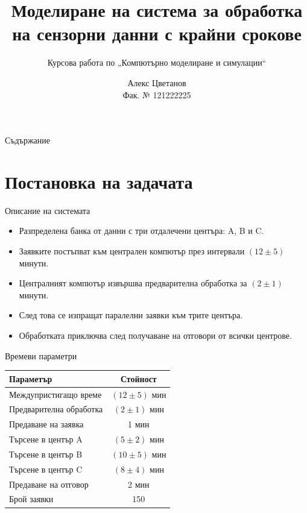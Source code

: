 \documentclass[aspectratio=169]{beamer}
\title{Моделиране на система за обработка на сензорни данни с крайни срокове}
\subtitle{Курсова работа по „Компютърно моделиране и симулации“}
\author{Алекс Цветанов\\Фак. № 121222225}
\institute{Технически университет -- София\\Факултет „Компютърни системи и технологии“}
\date{}
\begin{document}
\begin{frame}
    \titlepage
\end{frame}

\begin{frame}{Съдържание}
    \tableofcontents
\end{frame}

\section{Постановка на задачата}

\begin{frame}{Описание на системата}
    \begin{itemize}
        \item Разпределена банка от данни с три отдалечени центъра: A, B и C.
        \item Заявките постъпват към централен компютър през интервали \((12 \pm 5)\) минути.
        \item Централният компютър извършва предварителна обработка за \((2 \pm 1)\) минути.
        \item След това се изпращат паралелни заявки към трите центъра.
        \item Обработката приключва след получаване на отговори от всички центрове.
    \end{itemize}
\end{frame}

\begin{frame}{Времеви параметри}
    \begin{table}[ht]
        \centering
        \begin{tabular}{lc}
            \toprule
            Параметър & Стойност \\
            \midrule
            Междупристигащо време & \((12 \pm 5)\) мин \\
            Предварителна обработка & \((2 \pm 1)\) мин \\
            Предаване на заявка & 1 мин \\
            Търсене в център A & \((5 \pm 2)\) мин \\
            Търсене в център B & \((10 \pm 5)\) мин \\
            Търсене в център C & \((8 \pm 4)\) мин \\
            Предаване на отговор & 2 мин \\
            Брой заявки & 150 \\
            \bottomrule
        \end{tabular}
    \end{table}
\end{frame}
\end{document}
